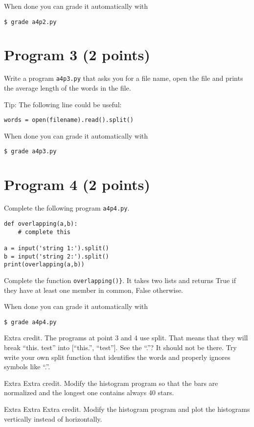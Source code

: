 \documentclass[12pt]{article}
\begin{document}
\noindent When done you can grade it automatically with
\begin{verbatim}
$ grade a4p2.py
\end{verbatim}


\section{Program 3 (2 points)}

\noindent
Write a program {\tt a4p3.py} 
that asks you for a file name, open the file and prints the average          
length of the words in the file.

Tip: The following line could be useful:
\begin{verbatim}
words = open(filename).read().split()
\end{verbatim}

\noindent When done you can grade it automatically with
\begin{verbatim}
$ grade a4p3.py
\end{verbatim}

\section{Program 4 (2 points)}

\noindent
Complete the following program {\tt a4p4.py}.
\begin{verbatim}
def overlapping(a,b):
    # complete this

a = input('string 1:').split()
b = input('string 2:').split()
print(overlapping(a,b))
\end{verbatim}
Complete the function {\tt overlapping()\}}. 
It takes two lists and returns True if they have at least one member in common, False otherwise. 

\noindent When done you can grade it automatically with
\begin{verbatim}
$ grade a4p4.py
\end{verbatim}

Extra credit. The programs at point 3 and 4 use split. That means that they will break ``this. test'' into [``this.'', ``test'']. See the ``.''? It should not be there. Try write your own split function that identifies the words and properly ignores symbols like ``.''.

Extra Extra credit. Modify the histogram program so that the bars are normalized and the longest one contains always 40 stars.

Extra Extra Extra credit. Modify the histogram program and plot the histograms vertically instead of horizontally.
\end{document}

